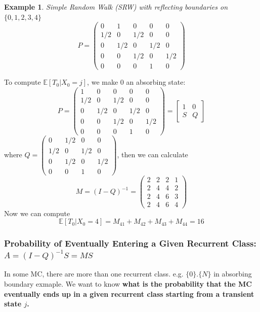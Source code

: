 \documentclass[11pt,a4paper]{article}
\newtheorem{example}{Example}
\begin{document}
\begin{example}
    Simple Random Walk (SRW) with reflecting boundaries on $\{0,1,2,3,4\}$
    $$P=\left(\begin{array}{ccccc}
    0 & 1 & 0 & 0 & 0 \\
    1 / 2 & 0 & 1 / 2 & 0 & 0 \\
    0 & 1 / 2 & 0 & 1 / 2 & 0 \\
    0 & 0 & 1 / 2 & 0 & 1 / 2 \\
    0 & 0 & 0 & 1 & 0
    \end{array}\right)$$
\end{example}
To compute $\mathbb{E}[T_0|X_0=j]$, we make $0$ an absorbing state:
$$P=\left(\begin{array}{ccccc}
    1 & 0 & 0 & 0 & 0 \\
    1 / 2 & 0 & 1 / 2 & 0 & 0 \\
    0 & 1 / 2 & 0 & 1 / 2 & 0 \\
    0 & 0 & 1 / 2 & 0 & 1 / 2 \\
    0 & 0 & 0 & 1 & 0
    \end{array}\right)=\begin{bmatrix}
        1&	0\\
        S&	Q
    \end{bmatrix}$$
where $Q=\left(\begin{array}{ccccc}
    0 & 1 / 2 & 0 & 0 \\
    1 / 2 & 0 & 1 / 2 & 0 \\
    0 & 1 / 2 & 0 & 1 / 2 \\
    0 & 0 & 1 & 0
    \end{array}\right)$, then we can calculate $$M=(I-Q)^{-1}=\left(\begin{array}{ccccc}
        2 & 2 & 2 & 1 \\
        2 & 4 & 4 & 2 \\
        2 & 4 & 6 & 3 \\
        2 & 4 & 6 & 4
        \end{array}\right)$$
Now we can compute $$\mathbb{E}[T_0|X_0=4]=M_{41}+M_{42}+M_{43}+M_{44}=16$$

\subsubsection{Probability of Eventually Entering a Given Recurrent Class: $A=(I-Q)^{-1}S=MS$}
In some MC, there are more than one recurrent class. e.g. $\{0\}.\{N\}$ in absorbing boundary exmaple. We want to know \textbf{what is the probability that the MC eventually ends up in a given recurrent class starting from a transient state $j$.}
\end{document}
